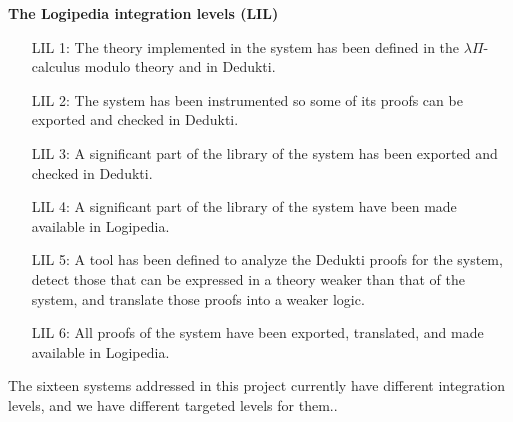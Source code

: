 \begin{framed}
\begin{center}
{\bf The Logipedia integration levels (LIL)\label{lil}}
\end{center}

\begin{itemize}
\item[LIL 1:]
The theory implemented in the system has been defined in
the $\lambda\Pi$-calculus modulo theory and in Dedukti.

\item[LIL 2:]
The system has been instrumented so some of its proofs can be exported
and checked in Dedukti.

\item[LIL 3:] A significant part of the library of the system has been
  exported and checked in Dedukti.

\item[LIL 4:] A significant part of the library of the system have
  been made available in Logipedia.

\item[LIL 5:]
A tool has been defined to analyze the Dedukti proofs for the system,
detect those that can be expressed in a theory weaker than that of the
system, and translate those proofs into a weaker logic.

\item[LIL 6:]
All proofs of the system have been exported, translated,
and made available in Logipedia.
\end{itemize}
\end{framed}

The sixteen systems addressed in this project currently have different
integration levels, and we have different targeted levels for them.. 


